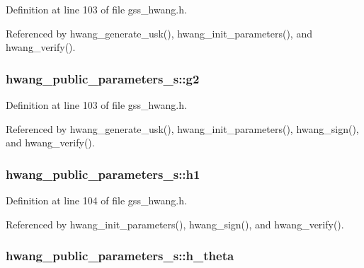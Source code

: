 Definition at line 103 of file gss\-\_\-hwang.\-h.



Referenced by hwang\-\_\-generate\-\_\-usk(), hwang\-\_\-init\-\_\-parameters(), and hwang\-\_\-verify().

\hypertarget{structhwang__public__parameters__s_a7dd7dbff0fa94ecd607f0e89827ac4f6}{
\subsubsection[{g2}]{ hwang\-\_\-public\-\_\-parameters\-\_\-s\-::g2}}\label{structhwang__public__parameters__s_a7dd7dbff0fa94ecd607f0e89827ac4f6}


Definition at line 103 of file gss\-\_\-hwang.\-h.



Referenced by hwang\-\_\-generate\-\_\-usk(), hwang\-\_\-init\-\_\-parameters(), hwang\-\_\-sign(), and hwang\-\_\-verify().

\hypertarget{structhwang__public__parameters__s_a6612c7bab543c203426624532d2544e3}{
\subsubsection[{h1}]{ hwang\-\_\-public\-\_\-parameters\-\_\-s\-::h1}}\label{structhwang__public__parameters__s_a6612c7bab543c203426624532d2544e3}


Definition at line 104 of file gss\-\_\-hwang.\-h.



Referenced by hwang\-\_\-init\-\_\-parameters(), hwang\-\_\-sign(), and hwang\-\_\-verify().

\hypertarget{structhwang__public__parameters__s_a989ee9630aa37f07a95f398250ac878c}{
\subsubsection[{h\-\_\-theta}]{ hwang\-\_\-public\-\_\-parameters\-\_\-s\-::h\-\_\-theta}}\label{structhwang__public__parameters__s_a989ee9630aa37f07a95f398250ac878c}


